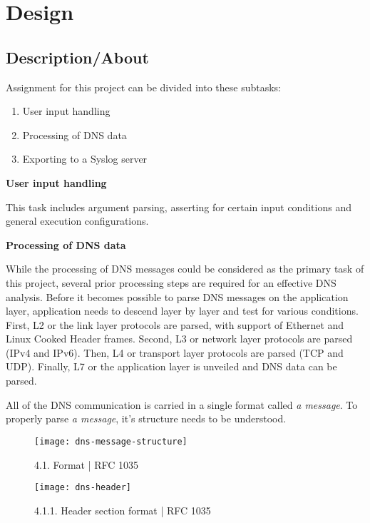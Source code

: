 \section{Design}

\subsection{Description/About}

Assignment for this project can be divided into these subtasks:
\begin{enumerate}
\item User input handling
\item Processing of DNS data
\item Exporting to a Syslog server
\end{enumerate}

\vspace{1cm}
\textbf{User input handling}

This task includes argument parsing, asserting for certain input conditions and general execution configurations.

\vspace{1cm}
\textbf{Processing of DNS data}

While the processing of DNS messages could be considered as the primary task of this project, several prior processing steps are required for an effective DNS analysis.
Before it becomes possible to parse DNS messages on the application layer, application needs to descend layer by layer and test for various conditions.
First, L2 or the link layer protocols are parsed, with support of Ethernet and Linux Cooked Header frames. Second, L3 or network layer protocols are parsed (IPv4 and IPv6).
Then, L4 or transport layer protocols are parsed (TCP and UDP). Finally, L7 or the application layer is unveiled and DNS data can be parsed.

\vspace{0.5cm}

All of the DNS communication is carried in a single format called \textit{a message}.
To properly parse \textit{a message}, it's structure needs to be understood.

\begin{figure}[h]
\texttt{[image: dns-message-structure]}
\centering
\caption{4.1. Format | RFC 1035}
\end{figure}

\pagebreak

\begin{figure}[h]
\texttt{[image: dns-header]}
\centering
\caption{4.1.1. Header section format | RFC 1035}
\end{figure}

